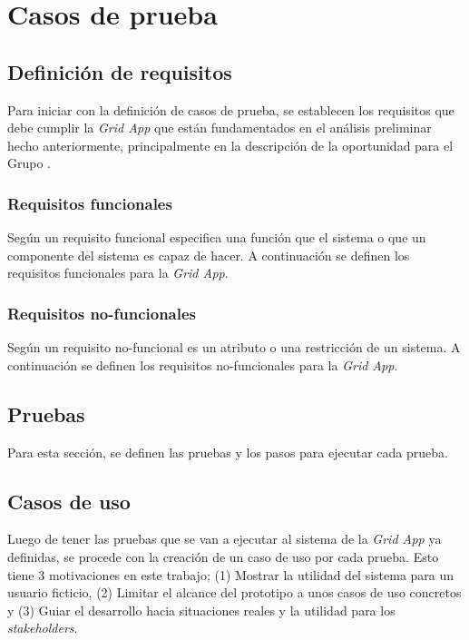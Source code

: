 \section{Casos de prueba}
\noindent

\subsection{Definición de requisitos}
\noindent
Para iniciar con la definición de casos de prueba, se establecen los requisitos que debe cumplir la \textit{Grid App} que están fundamentados en el análisis preliminar hecho anteriormente, principalmente en la descripción de la oportunidad para el Grupo \GRID.

\subsubsection{Requisitos funcionales}
\noindent
Según \cite{159342} un requisito funcional especifica una función que el sistema o que un componente del sistema es capaz de hacer. A continuación se definen los requisitos funcionales para la \textit{Grid App}.


\subsubsection{Requisitos no-funcionales}
\noindent
Según \cite{4384163} un requisito no-funcional es un atributo o una restricción de un sistema. A continuación se definen los requisitos no-funcionales para la \textit{Grid App}.


\subsection{Pruebas}
\noindent
Para esta sección, se definen las pruebas y los pasos para ejecutar cada prueba.


\subsection{Casos de uso}
\noindent
Luego de tener las pruebas que se van a ejecutar al sistema de la \textit{Grid App} ya definidas, se procede con la creación de un caso de uso por cada prueba. Esto tiene 3 motivaciones en este trabajo; (1) Mostrar la utilidad del sistema para un usuario ficticio, (2) Limitar el alcance del prototipo a unos casos de uso concretos y (3) Guiar el desarrollo hacia situaciones reales y la utilidad para los \textit{stakeholders}.

